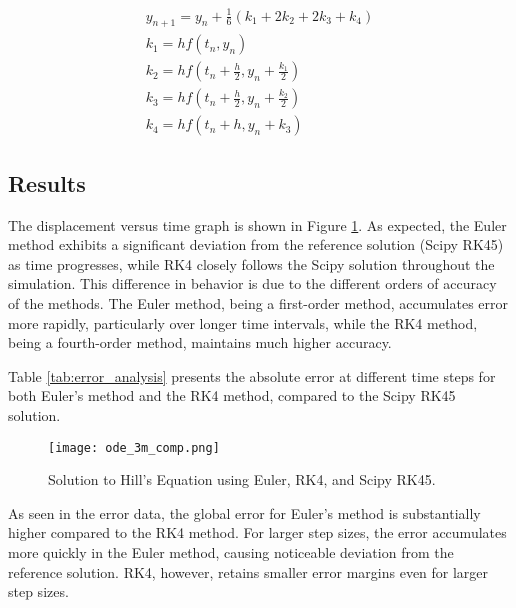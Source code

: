 \documentclass[twocolumn, 11pt]{article}
\begin{document}
\begin{gather} \label{rk4}
     y_{n+1} = y_n + \frac{1}{6} (k_1 + 2k_2 + 2k_3 + k_4)\\
     k_1 = h f(t_n, y_n)\\
    k_2 = h f\left(t_n + \frac{h}{2}, y_n + \frac{k_1}{2}\right)\\
    k_3 = h f\left(t_n + \frac{h}{2}, y_n + \frac{k_2}{2}\right)\\
    k_4 = h f(t_n + h, y_n + k_3)
\end{gather}
  
\subsection{Results}
The displacement versus time graph is shown in Figure \ref{fig:hill}. As expected, the Euler method exhibits a significant deviation from the reference solution (Scipy RK45) as time progresses, while RK4 closely follows the Scipy solution throughout the simulation. This difference in behavior is due to the different orders of accuracy of the methods. The Euler method, being a first-order method, accumulates error more rapidly, particularly over longer time intervals, while the RK4 method, being a fourth-order method, maintains much higher accuracy.

Table \ref{tab:error_analysis} presents the absolute error at different time steps for both Euler's method and the RK4 method, compared to the Scipy RK45 solution.

\begin{figure}[h!]
\centering
\texttt{[image: ode\_3m\_comp.png]}
\caption{Solution to Hill's Equation using Euler, RK4, and Scipy RK45.}
\label{fig:hill}
\end{figure}

As seen in the error data, the global error for Euler's method is substantially higher compared to the RK4 method. For larger step sizes, the error accumulates more quickly in the Euler method, causing noticeable deviation from the reference solution. RK4, however, retains smaller error margins even for larger step sizes.
\end{document}
